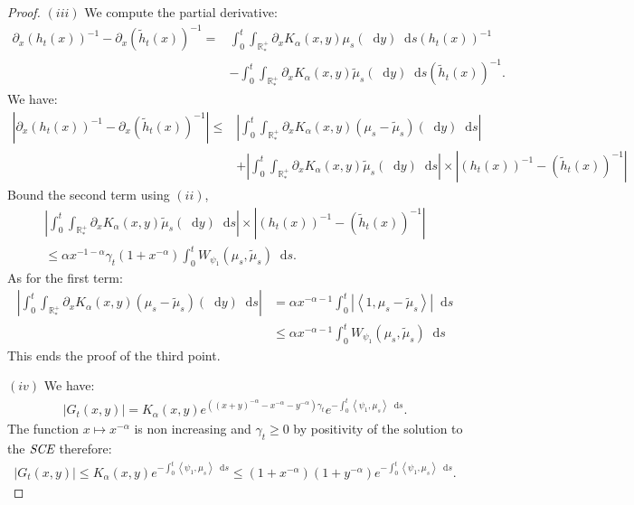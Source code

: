 \documentclass[11pt,a4paper]{article}
\newcommand{\RRP}{\mathbb{R}^+_*}
\newcommand{\SCE}{\emph{SCE}}
\newcommand{\brac}[1]{\left\langle#1\right\rangle}
\newcommand{\dd}{\mathop{}\!\mathrm{d}}
\begin{document}
\begin{proof}
    $(iii)$ We compute the partial derivative:
    \begin{align*}
        \partial_x \left( h_t(x)\right)^{-1}- \partial_x\left( \tilde{h}_t(x)\right)^{-1} =& \int_0^t \int_{\RRP} \partial_x K_\alpha(x,y) \mu_s(\dd y) \dd s \left( h_t(x)\right)^{-1} \\
        &- \int_0^t \int_{\RRP} \partial_x K_\alpha(x,y) \tilde{\mu}_s(\dd y) \dd s \left( \tilde{h}_t(x)\right)^{-1}.
    \end{align*}
    We have:
    \begin{align*}
        \left|\partial_x \left( h_t(x)\right)^{-1}- \partial_x\left( \tilde{h}_t(x)\right)^{-1} \right| \leq& \left|\int_0^t \int_{\RRP} \partial_x K_\alpha(x,y) \left( \mu_s - \tilde{\mu}_s\right)(\dd y) \dd s\right| \\
        &+ \left|\int_0^t \int_{\RRP} \partial_x K_\alpha(x,y) \tilde{\mu}_s(\dd y) \dd s\right| \times \left|\left( h_t(x)\right)^{-1}-\left( \tilde{h}_t(x)\right)^{-1} \right|
    \end{align*}
    Bound the second term using $(ii)$,
    \begin{multline*}
        \left|\int_0^t \int_{\RRP} \partial_x K_\alpha(x,y) \tilde{\mu}_s(\dd y) \dd s\right| \times \left|\left( h_t(x)\right)^{-1}-\left( \tilde{h}_t(x)\right)^{-1} \right| \\
        \leq \alpha x^{-1-\alpha} \gamma_t (1 + x^{-\alpha})\int_0^t W_{\psi_1}\left(\mu_s,\tilde{\mu}_s \right)\dd s.
    \end{multline*}
    As for the first term:
    \begin{align*}
        \left|\int_0^t \int_{\RRP} \partial_x K_\alpha(x,y) \left( \mu_s - \tilde{\mu}_s\right)(\dd y) \dd s\right| 
        &= \alpha x^{-\alpha-1} \int_0^t \left|\brac{1,\mu_s - \tilde{\mu}_s}\right| \dd s\\
        &\leq \alpha x^{-\alpha-1}\int_0^t W_{\psi_1} (\mu_s,\tilde{\mu}_s)\dd s
    \end{align*}
    This ends the proof of the third point.

    $(iv)$ We have:
    \begin{align*}
        \left|G_t(x,y)\right| = K_\alpha(x,y) e^{\left((x+y)^{-\alpha} - x^{-\alpha}- y^{-\alpha}\right)\gamma_t} e^{-\int_0^t \brac{\psi_1,\mu_s}\dd s}.
    \end{align*}
    The function $x \mapsto x^{-\alpha}$ is non increasing and $\gamma_t \geq 0$ by positivity of the solution to the $\SCE$ therefore:
    \begin{align*}
        \left|G_t(x,y)\right| \leq K_\alpha(x,y)e^{-\int_0^t \brac{\psi_1,\mu_s}\dd s} \leq (1 + x^{-\alpha})(1 + y^{-\alpha})e^{-\int_0^t \brac{\psi_1,\mu_s}\dd s}.
    \end{align*}


\end{proof}
\end{document}
